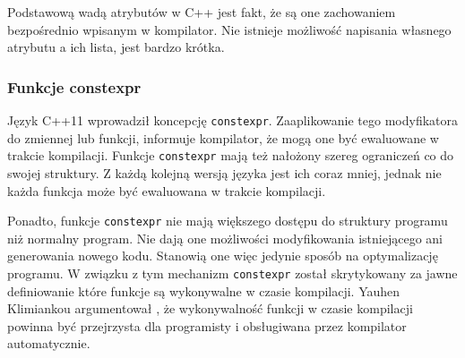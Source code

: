 Podstawową wadą atrybutów w C++ jest fakt, że są one zachowaniem bezpośrednio wpisanym w kompilator. Nie istnieje możliwość napisania własnego atrybutu a ich lista, jest bardzo krótka.\par
\subsubsection{Funkcje constexpr}
Język C++11 wprowadził koncepcję \lstinline{constexpr}. %
Zaaplikowanie tego modyfikatora do zmiennej lub funkcji, informuje kompilator, że mogą one być ewaluowane w trakcie kompilacji. Funkcje \lstinline{constexpr} mają też nałożony szereg ograniczeń co do swojej struktury. Z każdą kolejną wersją języka jest ich coraz mniej, jednak nie każda funkcja może być ewaluowana w trakcie kompilacji.

Ponadto, funkcje \lstinline{constexpr} nie mają większego dostępu do struktury programu niż normalny program. Nie dają one możliwości modyfikowania istniejącego ani generowania nowego kodu. Stanowią one więc jedynie sposób na optymalizację programu.
W związku z tym mechanizm \lstinline{constexpr} został skrytykowany za jawne definiowanie które funkcje są wykonywalne w czasie kompilacji.
Yauhen Klimiankou argumentował \cite{Klimiankou:contexpr_great_good_wrong_idea}, że wykonywalność funkcji w czasie kompilacji powinna być przejrzysta dla programisty i obsługiwana przez kompilator automatycznie.

